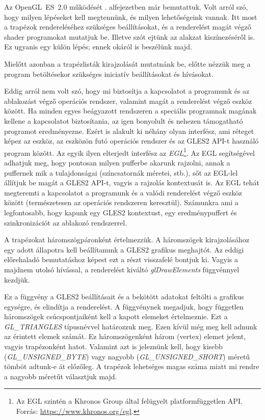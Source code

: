 \documentclass[12pt]{report}
\theoremstyle{definition}
\newcommand{\func}[1]{{\textsl{#1}}}
\begin{document}
Az OpenGL~ES~2.0 működését . alfejezetben már bemutattuk. Volt
arról szó, hogy milyen lépéseket kell megtennünk, és milyen lehetőségeink
vannak. Itt most a trapézok rendereléséhez szükséges beállításokat, és a
renderelést magát végző shader programokat mutatjuk be. Illetve szót ejtünk az
alakzat kiszínezéséről is. Ez ugyanis egy külön lépés; ennek okáról is
beszélünk majd.

Mielőtt azonban a trapézlisták kirajzolását mutatnánk be, előtte nézzük meg a
program betöltésekor szükséges iniciatív beállításokat és hívásokat.

Eddig arról nem volt szó, hogy mi biztosítja a kapcsolatot a programunk és az
ablakozást végző operációs rendszer, valamint magát a renderelést végző eszköz
között. Ha minden egyes beágyazott rendszeren a speciális programnak magának
kellene a kapcsolatot biztosítania, az igen bonyolult és nehezen támogatható
programot eredményezne. Ezért is alakult ki néhány olyan interfész, ami réteget
képez az eszköz, az eszközön futó operációs rendszer és az GLES2 API-t használó
program között. Az egyik ilyen elterjedt interfész az \emph{EGL}\footnote{Az
EGL szintén a Khronos Group által felügyelt platformfüggetlen API. \\ Forrás:
\footnotesize{\url{https://www.khronos.org/egl}}.}. Az EGL segítségével
adhatjuk meg, hogy pontosan milyen pufferbe akarunk rajzolni, annak a puffernek
mik a tulajdonságai (színcsatornák méretei, stb.), sőt az EGL-lel állítjuk be
magát a GLES2 API-t, vagyis a rajzolás kontextusát is. Az EGL tehát megteremti
a kapcsolatot a programunk és a valódi renderelést végző eszköz között
(természetesen az operációs rendszeren keresztül). Számunkra ami a
legfontosabb, hogy kapunk egy GLES2 kontextust, egy eredménypuffert és
szinkronizációt az ablakozó rendszerrel.

A trapézokat háromszögpáronként értelmezzük. A háromszögek kirajzolásához egy
adott állapotra kell beállítanunk a GLES2 grafikus meghajtót. Az eddigi
előrehaladó bemutatáshoz képest ezt a részt visszafelé bontjuk ki. Vagyis a
majdnem utolsó hívással, a renderelést kiváltó \func{glDrawElements}
függvénnyel kezdjük.

Ez a függvény a GLES2 beállításait és a bekötött adatokat feltölti a grafikus
egységre, és elindítja a renderelést. A függvénynek megadjuk, hogy független
háromszögek csúcspontjaiként kell a kapott elemeket értelmeznie. Ezt a
\func{GL\_TRIANGLES} típusnévvel határozzuk meg. Ezen kívül még meg kell adnunk
az érintett elemek számát. Ez háromszögenként három (vertex) elemet jelent,
vagyis trapézonként hatot. Valamint azt is jeleznünk kell, hogy kisebb
(\func{GL\_UNSIGNED\_BYTE}) vagy nagyobb (\func{GL\_UNSIGNED\_SHORT}) méretű
tömböt adtunk-e át előzőleg. A trapézok lehetséges magas száma miatt mi rendre
a nagyobb méretűt választjuk majd.
\end{document}
